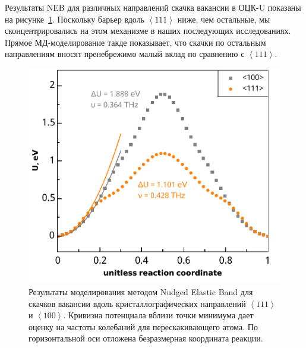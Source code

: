 \documentclass[master,14pt,subf,href,colorlinks=true
]{disser}
\begin{document}
Результаты NEB для различных направлений скачка вакансии в ОЦК-U показаны на рисунке~\ref{graph_NEB_parabolas}. Поскольку барьер вдоль $\left\langle 111\right\rangle$ ниже, чем остальные, мы сконцентрировались на этом механизме в наших последующих исследованиях. Прямое МД-моделирование такде показывает, что скачки по остальным направлениям вносят пренебрежимо малый вклад по сравнению с $\left\langle 111\right\rangle$.
\begin{figure}[h]
\begin{center}
\includegraphics[width=.7\linewidth]{NEB_parabolas.pdf}
\end{center}
\caption{\label{graph_NEB_parabolas} Результаты моделирования методом Nudged Elastic Band для скачков вакансии вдоль кристаллографических направлений $\left\langle 111\right\rangle$ и $\left\langle 100\right\rangle$. Кривизна потенциала вблизи точки минимума дает оценку на частоты колебаний для перескакивающего атома. По горизонтальной оси отложена безразмерная координата реакции.}
\end{figure}
\end{document}
